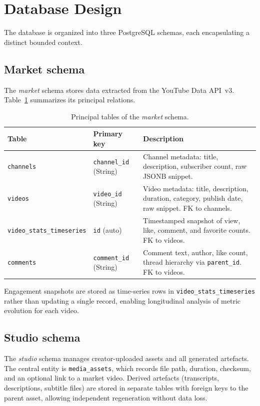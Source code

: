 \documentclass[ENG]{TFUOC}
\begin{document}
\section{Database Design}

The database is organized into three PostgreSQL schemas, each encapsulating a distinct bounded context.

\subsection*{Market schema}

The \textit{market} schema stores data extracted from the YouTube Data API~v3. Table~\ref{tab:market_schema} summarizes its principal relations.

\begin{table}[H]
\centering
\caption{Principal tables of the \textit{market} schema.}
\label{tab:market_schema}
\begin{tabular}{@{}llp{7.5cm}@{}}
\toprule
\textbf{Table} & \textbf{Primary key} & \textbf{Description} \\
\midrule
\texttt{channels} & \texttt{channel\_id} (String) & Channel metadata: title, description, subscriber count, raw JSONB snippet. \\
\texttt{videos} & \texttt{video\_id} (String) & Video metadata: title, description, duration, category, publish date, raw snippet. FK to channels. \\
\texttt{video\_stats\_timeseries} & \texttt{id} (auto) & Timestamped snapshot of view, like, comment, and favorite counts. FK to videos. \\
\texttt{comments} & \texttt{comment\_id} (String) & Comment text, author, like count, thread hierarchy via \texttt{parent\_id}. FK to videos. \\
\bottomrule
\end{tabular}
\end{table}

Engagement snapshots are stored as time-series rows in \texttt{video\_stats\_timeseries} rather than updating a single record, enabling longitudinal analysis of metric evolution for each video.

\subsection*{Studio schema}

The \textit{studio} schema manages creator-uploaded assets and all generated artefacts. The central entity is \texttt{media\_assets}, which records file path, duration, checksum, and an optional link to a market video. Derived artefacts (transcripts, descriptions, subtitle files) are stored in separate tables with foreign keys to the parent asset, allowing independent regeneration without data loss.
\end{document}
